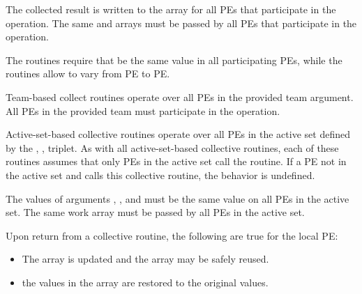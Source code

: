 \begin{apidefinition}
{{    The collected result is written to the \dest{} array for all \acp{PE}
    that participate in the operation. The same \dest{} and \source{}
    arrays must be passed by all \acp{PE} that participate in the operation.
}
    
    The  routines require that  be the same value in all
    participating \acp{PE}, while the  routines allow  to
    vary from \ac{PE} to \ac{PE}.

{\color{Green}
    Team-based collect routines operate over all \acp{PE} in the provided team argument. All
    \acp{PE} in the provided team must participate in the operation.

    Active-set-based collective routines operate over all \acp{PE} in the active set
    defined by the , ,  triplet.
    As with all active-set-based collective routines,
    each of these routines assumes that
    only \acp{PE} in the active set call the routine. If a \ac{PE} not in the
    active set and calls this collective routine, the behavior is undefined.
}
    
    The values of arguments , , and 
    must be the same value on all \acp{PE} in the active set. The same
     work array must be passed by all \acp{PE} in the active set.
    
    Upon return from a collective routine, the following are true for the local
    \ac{PE}:
    \begin{itemize}
    \item The \dest{} array is updated and the \source{} array may be safely reused. 
    \item {} the values in the  array are
    restored to the original values.
    \end{itemize}
}


\end{apidefinition}
